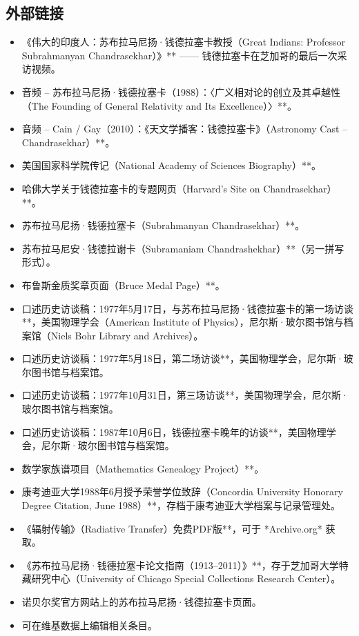 \subsection{外部链接}
\begin{itemize}
\item 《伟大的印度人：苏布拉马尼扬·钱德拉塞卡教授（Great Indians: Professor Subrahmanyan Chandrasekhar）》** —— 钱德拉塞卡在芝加哥的最后一次采访视频。

\item 音频 – 苏布拉马尼扬·钱德拉塞卡（1988）：〈广义相对论的创立及其卓越性（The Founding of General Relativity and Its Excellence）〉**。

\item 音频 – Cain / Gay（2010）：《天文学播客：钱德拉塞卡》（Astronomy Cast – Chandrasekhar）**。

\item 美国国家科学院传记（National Academy of Sciences Biography）**。

\item 哈佛大学关于钱德拉塞卡的专题网页（Harvard's Site on Chandrasekhar）**。

\item 苏布拉马尼扬·钱德拉塞卡（Subrahmanyan Chandrasekhar）**。

\item 苏布拉马尼安·钱德拉谢卡（Subramaniam Chandrashekhar）**（另一拼写形式）。

\item 布鲁斯金质奖章页面（Bruce Medal Page）**。

\item 口述历史访谈稿：1977年5月17日，与苏布拉马尼扬·钱德拉塞卡的第一场访谈**，美国物理学会（American Institute of Physics），尼尔斯·玻尔图书馆与档案馆（Niels Bohr Library and Archives）。

\item 口述历史访谈稿：1977年5月18日，第二场访谈**，美国物理学会，尼尔斯·玻尔图书馆与档案馆。

\item 口述历史访谈稿：1977年10月31日，第三场访谈**，美国物理学会，尼尔斯·玻尔图书馆与档案馆。

\item 口述历史访谈稿：1987年10月6日，钱德拉塞卡晚年的访谈**，美国物理学会，尼尔斯·玻尔图书馆与档案馆。

\item 数学家族谱项目（Mathematics Genealogy Project）**。

\item 康考迪亚大学1988年6月授予荣誉学位致辞（Concordia University Honorary Degree Citation, June 1988）**，存档于康考迪亚大学档案与记录管理处。

\item 《辐射传输》（Radiative Transfer）免费PDF版**，可于 *Archive.org* 获取。

\item 《苏布拉马尼扬·钱德拉塞卡论文指南（1913–2011）》**，存于芝加哥大学特藏研究中心（University of Chicago Special Collections Research Center）。
\item 诺贝尔奖官方网站上的苏布拉马尼扬·钱德拉塞卡页面。
\item 可在维基数据上编辑相关条目。
\end{itemize}